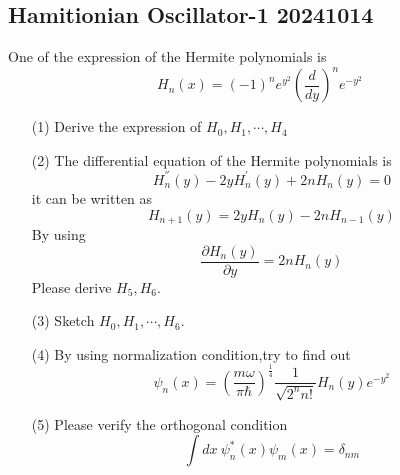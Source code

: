 \documentclass{article}
\begin{document}
\subsection{Hamitionian Oscillator-1 20241014}
One of the expression of the Hermite polynomials is
\begin{equation*}
    H_n(x)=(-1)^ne^{y^2}\left(\frac{d}{dy}\right)^ne^{-y^{2}}
\end{equation*}
\begin{enumerate}
    \item[(1)] Derive the expression of $H_0,H_1,\cdots,H_4$
    \item[(2)] The differential equation of the Hermite polynomials is
    \begin{equation*}
        H_n^{''}(y)-2yH_n^{'}(y)+2nH_n(y)=0
    \end{equation*}
    it can be written as
    \begin{equation*}
        H_{n+1}(y)=2yH_n(y)-2nH_{n-1}(y)
    \end{equation*}
    By using
    \begin{equation*}
        \frac{\partial H_n(y)}{\partial y}=2nH_n(y)
    \end{equation*}
    Please derive $H_5,H_6$.
    \item[(3)] Sketch $H_0,H_1,\cdots,H_6$.
    \item[(4)] By using normalization condition,try to find out 
    \begin{equation*}
        \psi_n(x)=\left(\frac{m\omega}{\pi\hbar}\right)^{\frac{1}{4}}\frac{1}{\sqrt{2^nn!}}H_n(y)e^{-y^2}
    \end{equation*}
    \item[(5)] Please verify the orthogonal condition
    \begin{equation*}
        \int dx\ \psi_n^{*}(x)\psi_m(x)=\delta_{nm}
    \end{equation*}
\end{enumerate}
\end{document}
